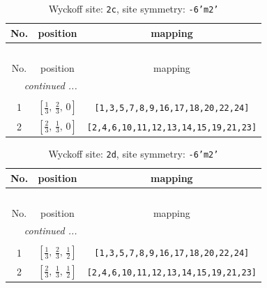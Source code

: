 \documentclass[fleqn,8pt]{jsarticle}
\begin{document}
\begin{longtable}{ccc}
\caption{Wyckoff site: {\tt 2c}, site symmetry: {\tt -6'm2'}}
 \\
 \hline \hline
No. & position & mapping \\ \hline \endfirsthead

\multicolumn{2}{l}{\tablename\ \thetable{}} \\
 \hline \hline
No. & position & mapping \\ \hline \endhead

 \hline \hline
\multicolumn{2}{r}{\footnotesize\it continued ...} \\ \endfoot

 \hline \hline
\multicolumn{2}{r}{} \\ \endlastfoot

1 & $\left[ \frac{1}{3},\, \frac{2}{3},\, 0 \right]$ & {\tt [1,3,5,7,8,9,16,17,18,20,22,24]} \\ \hline
2 & $\left[ \frac{2}{3},\, \frac{1}{3},\, 0 \right]$ & {\tt [2,4,6,10,11,12,13,14,15,19,21,23]} \\
\end{longtable}
\renewcommand{\arraystretch}{1.2}
\begin{longtable}{ccc}
\caption{Wyckoff site: {\tt 2d}, site symmetry: {\tt -6'm2'}}
 \\
 \hline \hline
No. & position & mapping \\ \hline \endfirsthead

\multicolumn{2}{l}{\tablename\ \thetable{}} \\
 \hline \hline
No. & position & mapping \\ \hline \endhead

 \hline \hline
\multicolumn{2}{r}{\footnotesize\it continued ...} \\ \endfoot

 \hline \hline
\multicolumn{2}{r}{} \\ \endlastfoot

1 & $\left[ \frac{1}{3},\, \frac{2}{3},\, \frac{1}{2} \right]$ & {\tt [1,3,5,7,8,9,16,17,18,20,22,24]} \\ \hline
2 & $\left[ \frac{2}{3},\, \frac{1}{3},\, \frac{1}{2} \right]$ & {\tt [2,4,6,10,11,12,13,14,15,19,21,23]} \\
\end{longtable}
\renewcommand{\arraystretch}{1.2}
\end{document}
